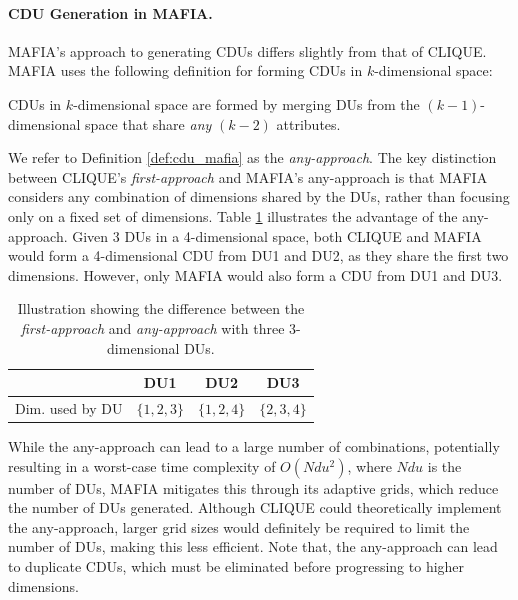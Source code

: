 \paragraph{CDU Generation in MAFIA.}
MAFIA's approach to generating CDUs differs slightly from that of CLIQUE. MAFIA uses the following definition for forming CDUs in $k$-dimensional space:
\begin{definition}\label{def:cdu_mafia}
    CDUs in $k$-dimensional space are formed by merging DUs from the $(k-1)$-dimensional space that share \textit{any} $(k-2)$ attributes.
\end{definition}
We refer to Definition \ref{def:cdu_mafia} as the \textit{any-approach}. The key distinction between CLIQUE's \textit{first-approach} and MAFIA's any-approach is that MAFIA considers any combination of dimensions shared by the DUs, rather than focusing only on a fixed set of dimensions. Table \ref{tab:cdu} illustrates the advantage of the any-approach. Given 3 DUs in a 4-dimensional space, both CLIQUE and MAFIA would form a 4-dimensional CDU from DU1 and DU2, as they share the first two dimensions. However, only MAFIA would also form a CDU from DU1 and DU3.
\begin{table}[H]
    \vspace*{-0.4cm}
    \centering
    \begin{tabular}{l|c|c|c|}
                        & DU1           & DU2           & DU3           \\ \hline
        Dim. used by DU & $\{1, 2, 3\}$ & $\{1, 2, 4\}$ & $\{2, 3, 4\}$ \\
    \end{tabular}
    \vspace*{0.2cm}
    \caption{Illustration showing the difference between the \textit{first-approach} and \textit{any-approach} with three 3-dimensional DUs.}
    \label{tab:cdu}
    \vspace*{-0.7cm}
\end{table}

While the any-approach can lead to a large number of combinations, potentially resulting in a worst-case time complexity of $O(Ndu^2)$, where $Ndu$ is the number of DUs, MAFIA mitigates this through its adaptive grids, which reduce the number of DUs generated. Although CLIQUE could theoretically implement the any-approach, larger grid sizes would definitely be required to limit the number of DUs, making this less efficient. Note that, the any-approach can lead to duplicate CDUs, which must be eliminated before progressing to higher dimensions.

